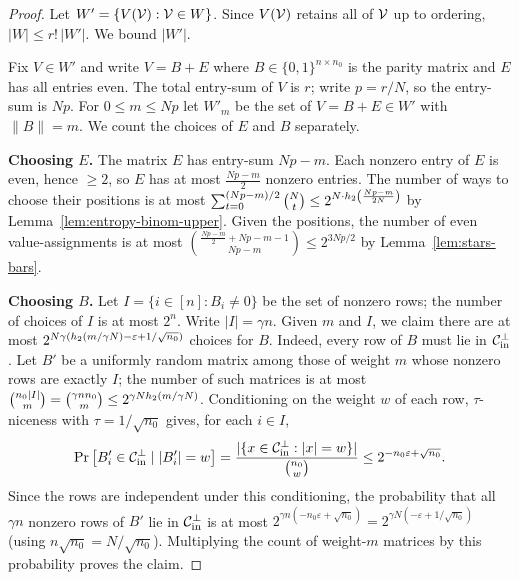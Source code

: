 \begin{proof}
  Let $W' = \{V(\mathcal{V}) : \mathcal{V} \in W\}$. Since $V(\mathcal{V})$ retains all of $\mathcal{V}$
  up to ordering, $|W| \leq r!\,|W'|$. We bound $|W'|$.

  Fix $V \in W'$ and write $V = B + E$ where $B \in \{0,1\}^{n\times n_0}$ is the
  parity matrix and $E$ has all entries even. The total entry-sum of $V$ is $r$;
  write $p = r/N$, so the entry-sum is $Np$. For $0 \leq m \leq Np$ let $W'_m$ be
  the set of $V = B+E \in W'$ with $\|B\| = m$. We count the choices of $E$ and
  $B$ separately.

  \textbf{Choosing $E$.} The matrix $E$ has entry-sum $Np - m$. Each nonzero
  entry of $E$ is even, hence $\geq 2$, so $E$ has at most $\frac{Np-m}{2}$
  nonzero entries. The number of ways to choose their positions is at most
  $\sum_{t=0}^{(Np-m)/2}\binom{N}{t} \leq 2^{N\cdot h_2\left(\frac{Np-m}{2N}\right)}$
  by Lemma~\ref{lem:entropy-binom-upper}. Given the positions, the number of even
  value-assignments is at most $\binom{\frac{Np-m}{2}+Np-m-1}{Np-m}\leq 2^{3Np/2}$
  by Lemma~\ref{lem:stars-bars}.

  \textbf{Choosing $B$.} Let $I = \{i \in [n] : B_i \neq 0\}$ be the set of
  nonzero rows; the number of choices of $I$ is at most $2^n$. Write
  $|I| = \gamma n$. Given $m$ and $I$, we claim there are at most
  $2^{N\gamma(h_2(m/\gamma N) - \varepsilon + 1/\sqrt{n_0})}$ choices for $B$.
  Indeed, every row of $B$ must lie in $\mathcal{C}_{\mathrm{in}}^\perp$. Let $B'$ be a uniformly
  random matrix among those of weight $m$ whose nonzero rows are exactly $I$; the
  number of such matrices is at most
  $\binom{n_0|I|}{m} = \binom{\gamma n n_0}{m}\leq 2^{\gamma Nh_2(m/\gamma N)}$.
  Conditioning on the weight $w$ of each row, $\tau$-niceness with
  $\tau = 1/\sqrt{n_0}$ gives, for each $i \in I$,
  \[
    \Pr\big[B'_i \in \mathcal{C}_{\mathrm{in}}^\perp \mid |B'_i| = w\big]
      = \frac{|\{x \in \mathcal{C}_{\mathrm{in}}^\perp : |x| = w\}|}{\binom{n_0}{w}}
      \leq 2^{-n_0\varepsilon + \sqrt{n_0}} .
  \]
  Since the rows are independent under this conditioning, the probability that
  all $\gamma n$ nonzero rows of $B'$ lie in $\mathcal{C}_{\mathrm{in}}^\perp$ is at most
  $2^{\gamma n(-n_0\varepsilon + \sqrt{n_0})} = 2^{\gamma N(-\varepsilon +
  1/\sqrt{n_0})}$ (using $n\sqrt{n_0} = N/\sqrt{n_0}$). Multiplying the count of
  weight-$m$ matrices by this probability proves the claim.


\end{proof}
